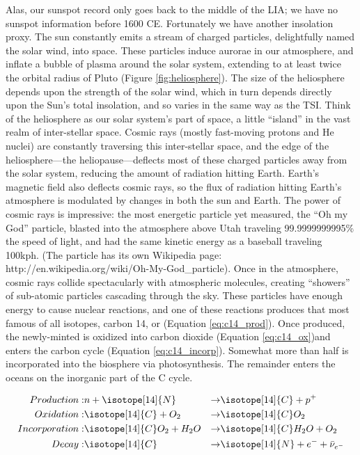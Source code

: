 \documentclass[amstex,12pt]{book}
\begin{document}
Alas, our sunspot record only goes back to the middle of the LIA; we have no sunspot information before 1600 CE. Fortunately we have another insolation proxy. The sun constantly emits a stream of charged particles, delightfully named the solar wind, into space. These particles induce aurorae in our atmosphere, and inflate a bubble of plasma around the solar system, extending to at least twice the orbital radius of Pluto (Figure \ref{fig:heliosphere}). The size of the heliosphere depends upon the strength of the solar wind, which in turn depends directly upon the Sun’s total insolation, and so varies in the same way as the TSI. Think of the heliosphere as our solar system's part of space, a little ``island'' in the vast realm of inter-stellar space. Cosmic rays (mostly fast-moving protons and He nuclei) are constantly traversing this inter-stellar space, and the edge of the heliosphere---the heliopause---deflects most of these charged particles away from the solar system, reducing the amount of radiation hitting Earth. Earth’s magnetic field also deflects cosmic rays, so the flux of radiation hitting Earth’s atmosphere is modulated by changes in both the sun and Earth.
The power of cosmic rays is impressive: the most energetic particle yet measured, the  “Oh my God” particle, blasted into the atmosphere above Utah traveling 99.9999999995\% the speed of light, and had the same kinetic energy as a baseball traveling 100kph. (The particle has its own Wikipedia page: http://en.wikipedia.org/wiki/Oh-My-God\_particle). Once in the atmosphere, cosmic rays collide spectacularly with atmospheric molecules, creating ``showers'' of sub-atomic particles cascading through the sky. These particles have enough energy to cause nuclear reactions, and one of these reactions produces that most famous of all isotopes, carbon 14, or   (Equation \ref{eq:c14_prod}). Once produced, the newly-minted  is oxidized into carbon dioxide (Equation \ref{eq:c14_ox})and enters the carbon cycle (Equation \ref{eq:c14_incorp}). Somewhat more than half is incorporated into the biosphere via photosynthesis. The remainder enters the oceans on the inorganic part of the C cycle.
 
\begin{align}
	Production: & n+\isotope[14]{N} & \rightarrow & \isotope[14]{C}+p^+ \label{eq:c14_prod} \\
	Oxidation:  & \isotope[14]{C}+O_2 & \rightarrow & \isotope[14]{C}O_2 \label{eq:c14_ox} \\
	Incorporation: & \isotope[14]{C}O_2+H_2O & \rightarrow & \isotope[14]{C}H_2O+O_2 \label {eq:c14_incorp} \\
	Decay: & \isotope[14]{C}&\rightarrow& \isotope[14]{N} + e^- +\bar{\nu}_{e^-}
\end{align}
\end{document}
